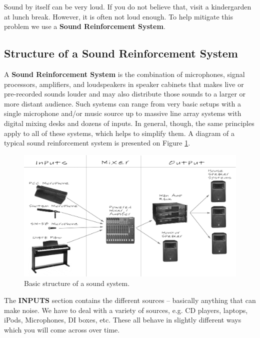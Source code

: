 \documentclass[14pt]{article} %
\begin{document}
Sound by itself can be very loud. If you do not believe that, visit a kindergarden at lunch break. However, it is often not loud enough. To help mitigate this problem we use a \textbf{Sound Reinforcement System}. 

\subsection{Structure of a Sound Reinforcement System}
\label{sound-system-structure}
A \textbf{Sound Reinforcement System} is the combination of microphones, signal processors, amplifiers, and loudspeakers in speaker cabinets that makes live or pre-recorded sounds louder and may also distribute those sounds to a larger or more distant audience. Such systems can range from very basic setups with a single microphone and/or music source up to massive line array systems with digital mixing desks and dozens of inputs. In general, though, the same principles apply to all of these systems, which helps to simplify them. A diagram of a typical sound reinforcement system is presented on Figure \ref{fig:intro}.

\begin{figure}[h]
\begin{center}

\includegraphics[width=18cm]{audio_labeled_diagram.jpg}
\caption{Basic structure of a sound system.}
\label{fig:intro}

\end{center}
\end{figure}

The \textbf{INPUTS} section contains the different sources – basically anything that can make noise. We have to deal with a variety of sources, e.g. CD players, laptops, iPods, Microphones, DI boxes, etc. These all behave in slightly different ways which you will come across over time.
\end{document}
